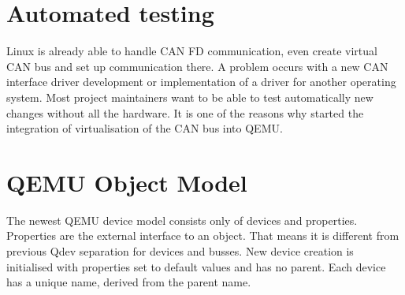 \documentclass{ctuthesis}
\begin{document}
 \section{Automated testing}
 Linux is already able to handle CAN FD communication, even create virtual CAN bus and set up communication there. A problem occurs with a new CAN interface driver development or implementation of a driver for another operating system. Most project maintainers want to be able to test automatically new changes without all the hardware. It is one of the reasons why started the integration of virtualisation of the CAN bus into QEMU\cite{qemu_development}.

 \section{QEMU Object Model}
  The newest QEMU device model consists only of devices and properties\cite{qemu_qom}. Properties are the external interface to an object. That means it is different from previous Qdev separation for devices and busses. New device creation is initialised with properties set to default values and has no parent. Each device has a unique name, derived from the parent name.
\end{document}
